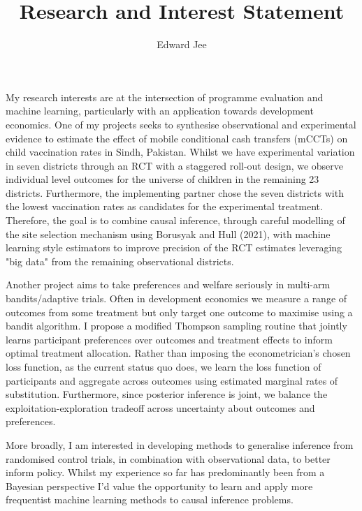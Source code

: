 \documentclass{article}
\author{Edward Jee}
\title{Research and Interest Statement}
\begin{document}
\maketitle

My research interests are at the intersection of programme evaluation and machine 
learning, particularly with an application towards development economics. One 
of my projects seeks to synthesise observational and experimental evidence to 
estimate the effect of mobile conditional cash transfers (mCCTs) on 
child vaccination rates in Sindh, Pakistan. Whilst we have experimental variation 
in seven districts through an RCT with a staggered roll-out design, we observe 
individual level outcomes for 
the universe of children in the remaining 23 districts. Furthermore, the implementing 
partner chose the seven districts with the lowest vaccination rates as candidates 
for the experimental treatment. Therefore, the goal is to combine causal inference, 
through careful modelling of the site selection mechanism using Borusyak and Hull (2021), 
with machine learning style estimators to improve precision of the RCT estimates 
leveraging "big data" from the remaining observational districts.



Another project aims to take preferences and welfare seriously in multi-arm 
bandits/adaptive trials. Often in development economics we measure a range of 
outcomes from some treatment but only target one outcome to maximise using a 
bandit algorithm. I propose a modified Thompson sampling routine that jointly 
learns participant preferences over outcomes and treatment effects to inform optimal treatment 
allocation. Rather than imposing the econometrician's chosen loss function, as 
the current status quo does, we learn the loss function of participants and 
aggregate across outcomes using estimated marginal rates of substitution. Furthermore, 
since posterior inference is joint, we balance the exploitation-exploration 
tradeoff across uncertainty about outcomes and preferences.


More broadly, I am interested in developing methods to generalise inference from 
randomised control trials, in combination with observational data, to better inform 
policy. Whilst my experience so far has predominantly been from a Bayesian perspective
I'd value the opportunity to learn and apply more frequentist machine learning methods 
to causal inference problems.



    
\end{document}
